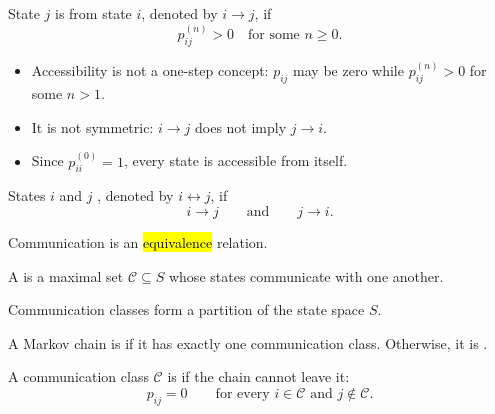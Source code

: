 \documentclass[8pt,a4paper,landscape]{extarticle}
\begin{document}
\begin{cscolumns}

\begin{definition}[Accessibility]
State $j$ is  from state $i$, denoted by $i\to j$, if
\[ p_{ij}^{(n)}>0 \quad \text{for some } n\ge 0. \]
\end{definition}

\begin{remark}
\begin{itemize}\setlength\itemsep{0pt}\setlength\topsep{0pt}
\item Accessibility is not a one-step concept: $p_{ij}$ may be zero while $p_{ij}^{(n)}>0$ for some $n>1$.
\item It is not symmetric: $i\to j$ does not imply $j\to i$.
\item Since $p_{ii}^{(0)}=1$, every state is accessible from itself.
\end{itemize}
\end{remark}

\begin{definition}[Communication]
States $i$ and $j$ , denoted by $i\longleftrightarrow j$, if
\[ i\to j \qquad\text{and}\qquad j\to i. \]
\end{definition}

\begin{note}
Communication is an \hl{equivalence} relation.
\end{note}

\begin{definition}
A  is a maximal set $\mathcal{C}\subseteq S$ whose states communicate with one another.
\end{definition}

\begin{note}
Communication classes form a partition of the state space $S$.
\end{note}

\begin{definition}
A Markov chain is  if it has exactly one communication class. Otherwise, it is .
\end{definition}

\begin{definition}
A communication class $\mathcal{C}$ is  if the chain cannot leave it:
\[ p_{ij}=0 \qquad \text{for every } i\in\mathcal{C} \text{ and } j\notin\mathcal{C}. \]
\end{definition}


\end{cscolumns}
\end{document}
